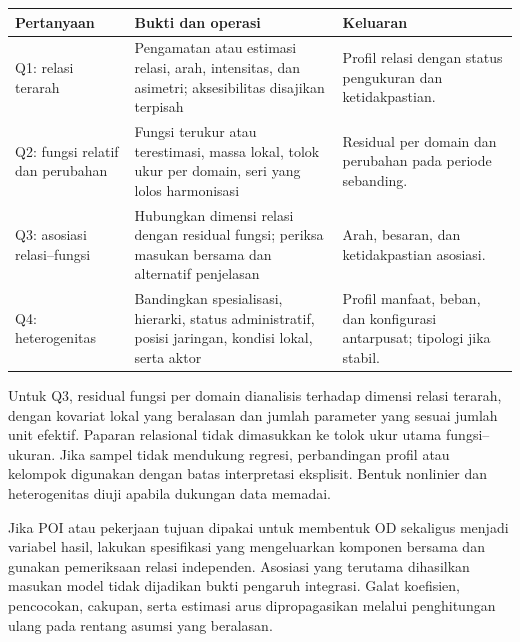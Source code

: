 \documentclass[
  indonesian,
  11pt,
  a4paper,
  oneside,
  openany]{report}
\newcounter{none} %
\begin{document}
{\def\LTcaptype{none} %
\begin{longtable}[]{@{}
  >{\raggedright\arraybackslash}p{}
  >{\raggedright\arraybackslash}p{}
  >{\raggedright\arraybackslash}p{}@{}}
\toprule\noalign{}
\begin{minipage}[b]{\linewidth}\raggedright
Pertanyaan
\end{minipage} & \begin{minipage}[b]{\linewidth}\raggedright
Bukti dan operasi
\end{minipage} & \begin{minipage}[b]{\linewidth}\raggedright
Keluaran
\end{minipage} \\
\midrule\noalign{}
\endhead
\bottomrule\noalign{}
\endlastfoot
Q1: relasi terarah & Pengamatan atau estimasi relasi, arah, intensitas,
dan asimetri; aksesibilitas disajikan terpisah & Profil relasi dengan
status pengukuran dan ketidakpastian. \\
Q2: fungsi relatif dan perubahan & Fungsi terukur atau terestimasi,
massa lokal, tolok ukur per domain, seri yang lolos harmonisasi &
Residual per domain dan perubahan pada periode sebanding. \\
Q3: asosiasi relasi--fungsi & Hubungkan dimensi relasi dengan residual
fungsi; periksa masukan bersama dan alternatif penjelasan & Arah,
besaran, dan ketidakpastian asosiasi. \\
Q4: heterogenitas & Bandingkan spesialisasi, hierarki, status
administratif, posisi jaringan, kondisi lokal, serta aktor & Profil
manfaat, beban, dan konfigurasi antarpusat; tipologi jika stabil. \\
\end{longtable}
}

Untuk Q3, residual fungsi per domain dianalisis terhadap dimensi relasi
terarah, dengan kovariat lokal yang beralasan dan jumlah parameter yang
sesuai jumlah unit efektif. Paparan relasional tidak dimasukkan ke tolok
ukur utama fungsi--ukuran. Jika sampel tidak mendukung regresi,
perbandingan profil atau kelompok digunakan dengan batas interpretasi
eksplisit. Bentuk nonlinier dan heterogenitas diuji apabila dukungan
data memadai.

Jika POI atau pekerjaan tujuan dipakai untuk membentuk OD sekaligus
menjadi variabel hasil, lakukan spesifikasi yang mengeluarkan komponen
bersama dan gunakan pemeriksaan relasi independen. Asosiasi yang
terutama dihasilkan masukan model tidak dijadikan bukti pengaruh
integrasi. Galat koefisien, pencocokan, cakupan, serta estimasi arus
dipropagasikan melalui penghitungan ulang pada rentang asumsi yang
beralasan.
\end{document}
